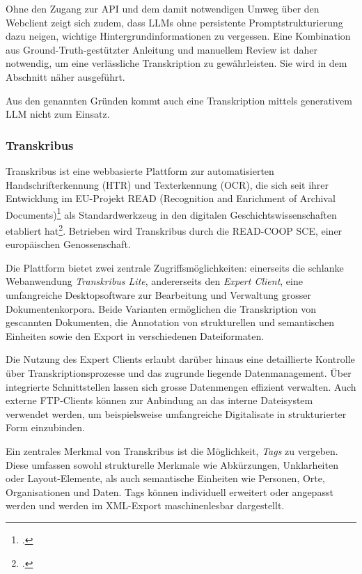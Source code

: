\documentclass[12pt, a4paper, ngerman, bidi=default]{article}
\let\cite\footcite
\begin{document}
Ohne den Zugang zur API und dem damit notwendigen Umweg über den Webclient zeigt sich 
zudem, dass LLMs ohne persistente Promptstrukturierung dazu neigen, wichtige Hintergrundinformationen zu vergessen. 
Eine Kombination aus Ground-Truth-gestützter Anleitung und manuellem Review ist daher notwendig, um eine verlässliche Transkription zu gewährleisten. Sie wird in dem Abschnitt  näher ausgeführt.

Aus den genannten Gründen kommt auch eine Transkription mittels generativem LLM nicht zum Einsatz.

\subsubsection{Transkribus}\label{subsubsec:Transkribus}
Transkribus ist eine webbasierte Plattform zur automatisierten Handschrifterkennung (HTR) und Texterkennung (OCR), die sich seit ihrer Entwicklung im EU-Projekt READ 
(Recognition and Enrichment of Archival Documents)\cite[vgl.][]{noauthor_recognition_nodate} als Standardwerkzeug in den digitalen Geschichtswissenschaften etabliert 
hat\cite[vgl.][]{muhlberger_transkribus_2019}. Betrieben wird Transkribus durch die READ-COOP SCE, einer europäischen Genossenschaft.

Die Plattform bietet zwei zentrale Zugriffsmöglichkeiten: einerseits die schlanke Webanwendung \textit{Transkribus Lite}, andererseits den \textit{Expert Client}, 
eine umfangreiche Desktopsoftware zur Bearbeitung und Verwaltung grosser Dokumentenkorpora. Beide Varianten ermöglichen die Transkription von gescannten Dokumenten, 
die Annotation von strukturellen und semantischen Einheiten sowie den Export in verschiedenen Dateiformaten. 

Die Nutzung des Expert Clients erlaubt darüber hinaus eine detaillierte Kontrolle über Transkriptionsprozesse und das zugrunde liegende Datenmanagement. 
Über integrierte Schnittstellen lassen sich grosse Datenmengen effizient verwalten. Auch externe FTP-Clients können zur Anbindung an das interne Dateisystem verwendet werden, 
um beispielsweise umfangreiche Digitalisate in strukturierter Form einzubinden.

Ein zentrales Merkmal von Transkribus ist die Möglichkeit, \textit{Tags} zu vergeben. Diese umfassen sowohl strukturelle Merkmale wie Abkürzungen, Unklarheiten oder Layout-Elemente, 
als auch semantische Einheiten wie Personen, Orte, Organisationen und Daten. Tags können individuell erweitert oder angepasst werden und werden im XML-Export maschinenlesbar dargestellt.
\end{document}
